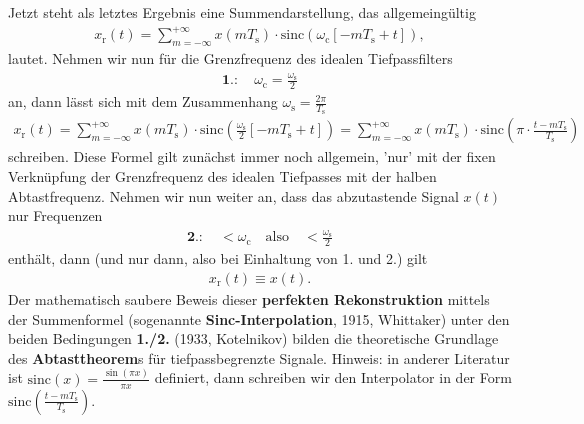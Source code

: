 \begin{mdframed}
Jetzt steht als letztes Ergebnis eine Summendarstellung, das allgemeingültig
\begin{align}
x_\mathrm{r}(t)
= \sum_{m=-\infty}^{+\infty} x(m T_\mathrm{s}) \cdot \mathrm{sinc}(\omega_\mathrm{c} [-m T_\mathrm{s} + t]),
\end{align}
lautet.
Nehmen wir nun für die Grenzfrequenz des idealen Tiefpassfilters
\begin{align}
\textbf{1.}:\quad\omega_\mathrm{c} = \frac{\omega_\mathrm{s}}{2}
\end{align}
an, dann lässt sich mit dem Zusammenhang
$\omega_\mathrm{s} = \frac{2\pi}{T_\mathrm{s}}$
\begin{align}
\label{eq:EF235EE3D8:ZeitSincInterpolation}
x_\mathrm{r}(t)=
\sum_{m=-\infty}^{+\infty} x(m T_\mathrm{s}) \cdot \mathrm{sinc}(\frac{\omega_\mathrm{s}}{2} [-m T_\mathrm{s} + t])=
\sum_{m=-\infty}^{+\infty} x(m T_\mathrm{s}) \cdot \mathrm{sinc}\left(\pi \cdot \frac{t-m T_\mathrm{s}}{T_\mathrm{s}}\right)
\end{align}
schreiben. Diese Formel gilt zunächst immer noch allgemein, 'nur' mit der
fixen Verknüpfung der Grenzfrequenz des idealen Tiefpasses mit der halben Abtastfrequenz.
Nehmen wir nun weiter an, dass das abzutastende Signal $x(t)$ nur Frequenzen
\begin{align}
\textbf{2.}:\quad<\omega_\mathrm{c}\quad\text{also}\quad<\frac{\omega_\mathrm{s}}{2}
\end{align}
enthält, dann (und nur dann, also bei Einhaltung von 1. und 2.) gilt
\begin{align}
x_\mathrm{r}(t) \equiv x(t).
\end{align}
Der mathematisch saubere Beweis dieser \textbf{perfekten Rekonstruktion}
mittels der Summenformel (sogenannte \textbf{Sinc-Interpolation}, 1915, Whittaker)
unter den beiden Bedingungen \textbf{1./2.} (1933, Kotelnikov) bilden die theoretische
Grundlage des \textbf{Abtasttheorem}s für tiefpassbegrenzte Signale.
%
Hinweis: in anderer Literatur ist $\mathrm{sinc}(x)=\frac{\sin(\pi x)}{\pi x}$ definiert,
dann schreiben wir den Interpolator in der Form
$\mathrm{sinc}\left(\frac{t-m T_\mathrm{s}}{T_\mathrm{s}}\right)$.
\end{mdframed}


